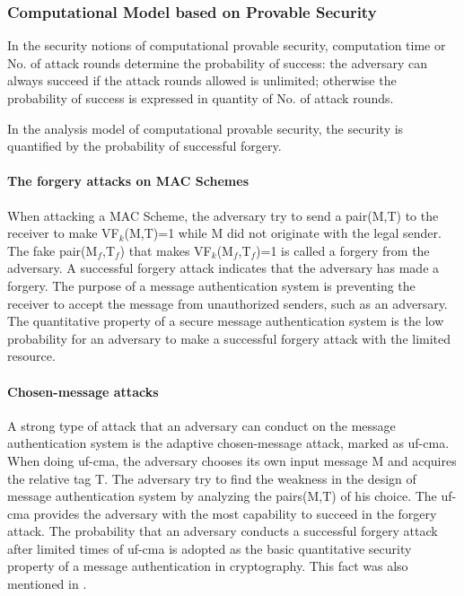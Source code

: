 \documentclass{article}
\begin{document}
\subsubsection{Computational Model based on Provable Security}
In the security notions of computational provable security, computation time or No. of attack rounds determine the probability of success: the adversary can always succeed if the attack rounds allowed is unlimited; otherwise the probability of success is expressed in quantity of No. of attack rounds.

In the analysis model of computational provable security, the security is quantified by the probability of successful forgery.

\paragraph{The forgery attacks on MAC Schemes}
When attacking a MAC Scheme, the adversary try to send a pair(M,T) to the receiver to make VF$_k$(M,T)=1 while M did not originate with the legal sender. The fake pair(M$_f$,T$_f$) that makes VF$_k$(M$_f$,T$_f$)=1 is called a forgery from the adversary. A successful forgery attack indicates that the adversary has made a forgery. 
The purpose of a message authentication system is preventing the receiver to accept the message from unauthorized senders, such as an adversary. The quantitative property of a secure message authentication system is the low probability for an adversary to make a successful forgery attack with the limited resource.
\paragraph{Chosen-message attacks}
A strong type of attack that an adversary can conduct on the message authentication system is the adaptive chosen-message attack, marked as uf-cma. When doing uf-cma, the adversary chooses its own input message M and acquires the relative tag T. The adversary try to find the weakness in the design of message authentication system by analyzing the pairs(M,T) of his choice. The uf-cma provides the adversary with the most capability to succeed in the forgery attack. The probability that an adversary conducts a successful forgery attack after limited times of uf-cma is adopted as the basic quantitative security property of a message authentication in cryptography. This fact was also mentioned in \cite{Rogaway2011}.
\end{document}
